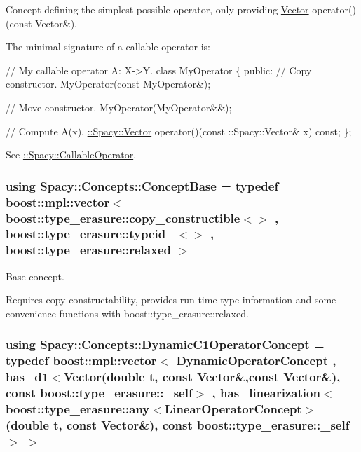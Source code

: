 Concept defining the simplest possible operator, only providing \hyperlink{classSpacy_1_1Vector}{Vector} operator()(const Vector\&). 

\label{group__ConceptGroup_gadec0c664abaacc2065dadd8b11cc8d30_CallableOperatorConceptAnchor}%
\hypertarget{group__ConceptGroup_gadec0c664abaacc2065dadd8b11cc8d30_CallableOperatorConceptAnchor}{}%
The minimal signature of a callable operator is\+: 
\begin{DoxyCode}
\textcolor{comment}{// My callable operator A: X->Y.}
\textcolor{keyword}{class }MyOperator
\{
\textcolor{keyword}{public}:
  \textcolor{comment}{// Copy constructor.}
  MyOperator(\textcolor{keyword}{const} MyOperator&);

  \textcolor{comment}{// Move constructor.}
  MyOperator(MyOperator&&);

  \textcolor{comment}{// Compute A(x).}
  \hyperlink{classSpacy_1_1Vector}{::Spacy::Vector} operator()(const ::Spacy::Vector& x) \textcolor{keyword}{const};
\};
\end{DoxyCode}


See \hyperlink{group__SpacyGroup_ga2b74020d806ad800795cdd97dab3466f_CallableOperatorAnchor}{\+:\+:Spacy\+:\+:Callable\+Operator}. \hypertarget{group__ConceptGroup_ga63426675cc05ccce03ead56a4fa90d96_ga63426675cc05ccce03ead56a4fa90d96}{}
\subsubsection[{Concept\+Base}]{\setlength{\rightskip}{0pt plus 5cm}using {\bf Spacy\+::\+Concepts\+::\+Concept\+Base} = typedef boost\+::mpl\+::vector$<$ boost\+::type\+\_\+erasure\+::copy\+\_\+constructible$<$$>$ , boost\+::type\+\_\+erasure\+::typeid\+\_\+$<$$>$ , boost\+::type\+\_\+erasure\+::relaxed $>$}\label{group__ConceptGroup_ga63426675cc05ccce03ead56a4fa90d96_ga63426675cc05ccce03ead56a4fa90d96}


Base concept. 

Requires copy-\/constructability, provides run-\/time type information and some convenience functions with boost\+::type\+\_\+erasure\+::relaxed. \hypertarget{group__ConceptGroup_gaa7ef0ce2d66b0610035541b580564b11_gaa7ef0ce2d66b0610035541b580564b11}{}
\subsubsection[{Dynamic\+C1\+Operator\+Concept}]{\setlength{\rightskip}{0pt plus 5cm}using {\bf Spacy\+::\+Concepts\+::\+Dynamic\+C1\+Operator\+Concept} = typedef boost\+::mpl\+::vector$<$ Dynamic\+Operator\+Concept , has\+\_\+d1$<$Vector(double t, const Vector\&,const Vector\&), const boost\+::type\+\_\+erasure\+::\+\_\+self$>$ , has\+\_\+linearization$<$boost\+::type\+\_\+erasure\+::any$<$Linear\+Operator\+Concept$>$(double t, const Vector\&), const boost\+::type\+\_\+erasure\+::\+\_\+self$>$ $>$}\label{group__ConceptGroup_gaa7ef0ce2d66b0610035541b580564b11_gaa7ef0ce2d66b0610035541b580564b11}


